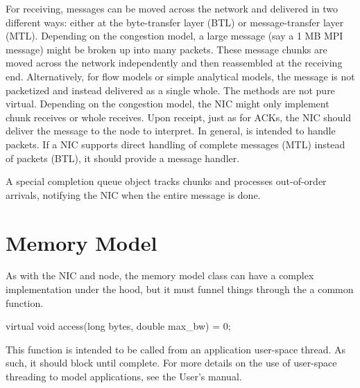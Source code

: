 For receiving, messages can be moved across the network and delivered in two different ways:
either at the byte-transfer layer (BTL) or message-transfer layer (MTL).
Depending on the congestion model, a large message (say a 1 MB MPI message) might be broken up into many packets.
These message chunks are moved across the network independently and then reassembled at the receiving end.
Alternatively, for flow models or simple analytical models, the message is not packetized and instead delivered as a single whole.
The methods are not pure virtual.  Depending on the congestion model,  the NIC might only implement chunk receives or whole receives.
Upon receipt, just as for ACKs, the NIC should deliver the message to the node to interpret.
In general,  is intended to handle packets. 
If a NIC supports direct handling of complete messages (MTL) instead of packets (BTL),
it should provide a message handler.

A special completion queue object tracks chunks and processes out-of-order arrivals,
notifying the NIC when the entire message is done.

\section{Memory Model}\label{sec:memModel}
As with the NIC and node, the memory model class can have a complex implementation under the hood,
but it must funnel things through the a common function.

\begin{CppCode}
virtual void access(long bytes, double max_bw) = 0;
\end{CppCode}

This function is intended to be called from an application user-space thread.
As such, it should block until complete.
For more details on the use of user-space threading to model applications,
see the User's manual.





